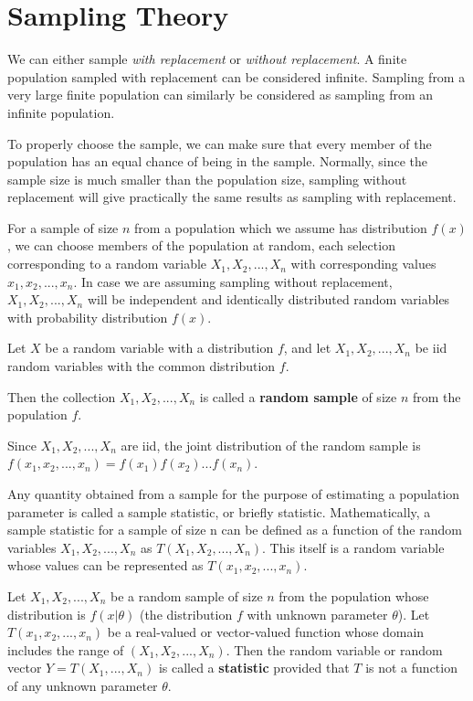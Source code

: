 \section*{Sampling Theory}
We can either sample \textit{with replacement} or \textit{without replacement}. A finite population sampled with replacement can be considered infinite. Sampling from a very large finite population can similarly be considered as sampling from an infinite population. 

To properly choose the sample, we can make sure that every member of the population has an equal chance of being in the sample.
Normally, since the sample size is much smaller than the population size, sampling without replacement will give practically the same results as sampling with replacement.

For a sample of size $n$ from a population which we assume has distribution $f(x)$, we can choose members of the population at random, each selection corresponding to a random variable $X_1, X_2, ..., X_n$ with corresponding values $x_1, x_2, ..., x_n$. In case we are assuming sampling without replacement, $X_1, X_2, ..., X_n$ will be independent and identically distributed random variables with probability distribution $f(x)$.

\begin{defn}
Let $X$ be a random variable with a distribution $f$, and let $X_1, X_2, ..., X_n$ be iid random variables with the common distribution $f$.

Then the collection $X_1, X_2, ..., X_n$ is called a \textbf{random sample} of size $n$ from the population $f$.
\end{defn}

Since $X_1, X_2, ..., X_n$ are iid, the joint distribution of the random sample is \\
$f(x_1, x_2, ..., x_n) = f(x_1) f(x_2) ... f(x_n)$.

Any quantity obtained from a sample for the purpose of estimating a population parameter is called a sample
statistic, or briefly statistic. Mathematically, a sample statistic for a sample of size n can be defined as a function of the random variables $X_1, X_2, ..., X_n$ as $T(X_1, X_2, ..., X_n)$. This itself is a random variable whose values can be represented as $T(x_1, x_2, ..., x_n)$.

\begin{defn}
    Let $X_1, X_2, ..., X_n$ be a random sample of size $n$ from the population whose distribution is $f\left (x|\theta\right )$ (the distribution $f$ with unknown parameter $\theta$). Let $T\left (x_1, x_2, ...,x_n\right )$ be a real-valued or vector-valued function whose domain includes the range of $\left (X_1, X_2, ..., X_n\right )$. Then the random variable or random vector $Y = T\left (X_1, ..., X_n\right )$ is called a \textbf{statistic} provided that $T$ is not a function of any unknown parameter $\theta$.
\end{defn}

